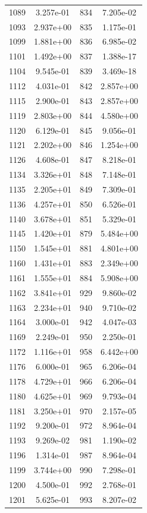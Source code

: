 \documentclass[12pt]{article}
\begin{document}
\begin{longtable}{@{}cccc@{}}
1089 & 3.257e-01 & 834 & 7.205e-02 \\
1093 & 2.937e+00 & 835 & 1.175e-01 \\
1099 & 1.881e+00 & 836 & 6.985e-02 \\
1101 & 1.492e+00 & 837 & 1.388e-17 \\
1104 & 9.545e-01 & 839 & 3.469e-18 \\
1112 & 4.031e-01 & 842 & 2.857e+00 \\
1115 & 2.900e-01 & 843 & 2.857e+00 \\
1119 & 2.803e+00 & 844 & 4.580e+00 \\
1120 & 6.129e-01 & 845 & 9.056e-01 \\
1121 & 2.202e+00 & 846 & 1.254e+00 \\
1126 & 4.608e-01 & 847 & 8.218e-01 \\
1134 & 3.326e+01 & 848 & 7.148e-01 \\
1135 & 2.205e+01 & 849 & 7.309e-01 \\
1136 & 4.257e+01 & 850 & 6.526e-01 \\
1140 & 3.678e+01 & 851 & 5.329e-01 \\
1145 & 1.420e+01 & 879 & 5.484e+00 \\
1150 & 1.545e+01 & 881 & 4.801e+00 \\
1160 & 1.431e+01 & 883 & 2.349e+00 \\
1161 & 1.555e+01 & 884 & 5.908e+00 \\
1162 & 3.841e+01 & 929 & 9.860e-02 \\
1163 & 2.234e+01 & 940 & 9.710e-02 \\
1164 & 3.000e-01 & 942 & 4.047e-03 \\
1169 & 2.249e-01 & 950 & 2.250e-01 \\
1172 & 1.116e+01 & 958 & 6.442e+00 \\
1176 & 6.000e-01 & 965 & 6.206e-04 \\
1178 & 4.729e+01 & 966 & 6.206e-04 \\
1180 & 4.625e+01 & 969 & 9.793e-04 \\
1181 & 3.250e+01 & 970 & 2.157e-05 \\
1192 & 9.200e-01 & 972 & 8.964e-04 \\
1193 & 9.269e-02 & 981 & 1.190e-02 \\
1196 & 1.314e-01 & 987 & 8.964e-04 \\
1199 & 3.744e+00 & 990 & 7.298e-01 \\
1200 & 4.500e-01 & 992 & 2.768e-01 \\
1201 & 5.625e-01 & 993 & 8.207e-02 \\

\end{longtable}
\end{document}
